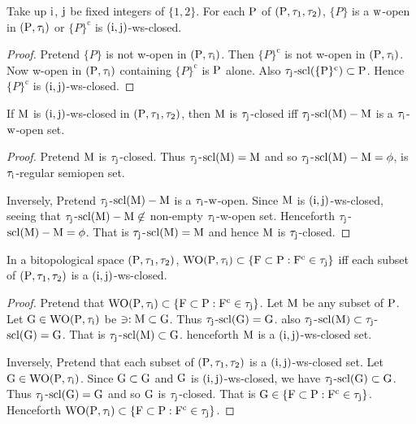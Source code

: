\begin{thm}\label{thm7.2.30}
Take up $\mathrm{i}$, $\mathrm{j}$ be fixed integers of $\{1, 2\}$. For each $\mathrm{P}$ of $(\mathrm{P}, \tau_1, \tau_2 )$, $\{P\}$ is a $\mathrm{w}$-open in $(\mathrm{P}, \tau_{\mathrm{i}} )$ or $\{P\}^{\text{c}}$ is $(\mathrm{i}, \mathrm{j})$-ws-closed.
\end{thm}

\begin{proof}
Pretend $\{P\}$ is not w-open in $(\mathrm{P}, \tau_{\mathrm{i}} )$. Then $\{P\}^{\text{c}}$ is not w-open in $(\mathrm{P}, \tau_{\mathrm{i}} )$. Now w-open in $(\mathrm{P}, \tau_{\mathrm{i}} )$ containing $\{P\}^{\text{c}}$ is $\mathrm{P}$ alone. Also $\tau_{\mathrm{j}}$-$\mathrm{scl}(\{\mathrm{P}\}^{\text{c}}) \subset \mathrm{P}$. Hence $\{P\}^{\text{c}}$ is $(\mathrm{i}, \mathrm{j})$-ws-closed.
\end{proof}

\begin{coro}\label{coro7.2.31}
If $\mathrm{M}$ is $(\mathrm{i}, \mathrm{j})$-ws-closed in $(\mathrm{P}, \tau_1, \tau_2 )$, then $\mathrm{M}$ is $\tau_{\mathrm{j}}$-closed iff $\tau_{\mathrm{j}}$-$\mathrm{scl}(\mathrm{M})-\mathrm{M}$ is a $\tau_{\mathrm{i}}$-$\mathrm{w}$-open set.
\end{coro}

\begin{proof}
Pretend $\mathrm{M}$ is $\tau_{\mathrm{j}}$-closed. Thus $\tau_{\mathrm{j}}$-$\mathrm{scl}(\mathrm{M}) = \mathrm{M}$ and so $\tau_{\mathrm{j}}$-$\mathrm{scl}(\mathrm{M})-\mathrm{M}=\phi$, is $\tau_{\mathrm{i}}$-regular semiopen set.

Inversely, Pretend $\tau_{\mathrm{j}}$-$\mathrm{scl}(\mathrm{M})-\mathrm{M}$ is a $\tau_{\mathrm{i}}$-$\mathrm{w}$-open. Since $\mathrm{M}$ is $(\mathrm{i}, \mathrm{j})$-ws-closed, seeing that $\tau_{\mathrm{j}}$-$\mathrm{scl}(\mathrm{M})-\mathrm{M}\not\in$ non-empty $\tau_{\mathrm{i}}$-w-open set. Henceforth $\tau_{\mathrm{j}}$-$\mathrm{scl}(\mathrm{M})-\mathrm{M}=\phi$. That is $\tau_{\mathrm{j}}$-$\mathrm{scl}(\mathrm{M})=\mathrm{M}$ and hence $\mathrm{M}$ is $\tau_{\mathrm{j}}$-closed.
\end{proof}

\begin{thm}\label{thm7.2.32}
In a bitopological space $(\mathrm{P}, \tau_1, \tau_2 )$, $\mathrm{WO}(\mathrm{P}, \tau_{\mathrm{i}} ) \subset \{\mathrm{F}\subset\mathrm{P}: \mathrm{F}^{\text{c}} \in\tau_{\mathrm{j}}\}$ iff each subset of $(\mathrm{P}, \tau_1, \tau_2 )$ is a $(\mathrm{i}, \mathrm{j})$-ws-closed.
\end{thm}

\begin{proof}
Pretend that $\mathrm{WO}(\mathrm{P}, \tau_{\mathrm{i}} ) \subset \{\mathrm{F}\subset \mathrm{P}: \mathrm{F}^{\text{c}} \in\tau_{\mathrm{j}} \}$. Let $\mathrm{M}$ be any subset of $\mathrm{P}$. Let $\mathrm{G}\in \mathrm{WO}(\mathrm{P}, \tau_{\mathrm{i}} )$ be $\ni: \mathrm{M} \subset \mathrm{G}$. Thus $\tau_{\mathrm{j}}$-$\mathrm{scl}(\mathrm{G})=\mathrm{G}$. also $\tau_{\mathrm{j}}$-$\mathrm{scl}(\mathrm{M}) \subset \tau_{\mathrm{j}}$-$\mathrm{scl}(\mathrm{G})=\mathrm{G}$. That is $\tau_{\mathrm{j}}$-$\mathrm{scl}(\mathrm{M}) \subset \mathrm{G}$. henceforth $\mathrm{M}$ is a $(\mathrm{i}, \mathrm{j})$-ws-closed set.

Inversely, Pretend that each subset of $(\mathrm{P}, \tau_1, \tau_2 )$ is a $(\mathrm{i}, \mathrm{j})$-ws-closed set. Let $\mathrm{G}\in \mathrm{WO}(\mathrm{P},\tau_{\mathrm{i}} )$. Since $\mathrm{G} \subset \mathrm{G}$ and $\mathrm{G}$ is $(\mathrm{i}, \mathrm{j})$-ws-closed, we have $\tau_{\mathrm{j}}$-$\mathrm{scl}(\mathrm{G}) \subset \mathrm{G}$. Thus $\tau_{\mathrm{j}}$-$\mathrm{scl}(\mathrm{G}) =\mathrm{G}$ and so $\mathrm{G}$ is $\tau_{\mathrm{j}}$-closed. That is $\mathrm{G}\in\{\mathrm{F}\subset \mathrm{P}: \mathrm{F}^{\text{c}} \in\tau_{\mathrm{j}} \}$. Henceforth $\mathrm{WO}(\mathrm{P}, \tau_{\mathrm{i}} ) \subset \{\mathrm{F}\subset \mathrm{P}: \mathrm{F}^{\text{c}} \in\tau_{\mathrm{j}} \}$. 
\end{proof}

